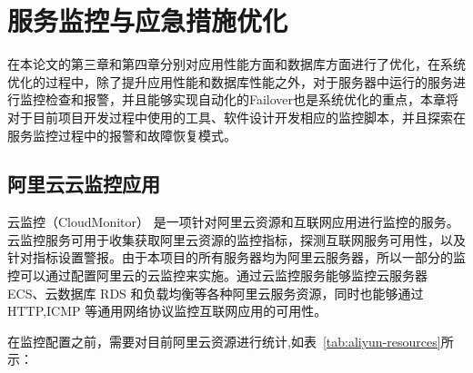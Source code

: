 \chapter{服务监控与应急措施优化}
在本论文的第三章和第四章分别对应用性能方面和数据库方面进行了优化，在系统优化的过程中，除了提升应用性能和数据库性能之外，对于服务器中运行的服务进行监控检查和报警，并且能够实现自动化的Failover也是系统优化的重点，本章将对于目前项目开发过程中使用的工具、软件设计开发相应的监控脚本，并且探索在服务监控过程中的报警和故障恢复模式。
\label{cha:Monitor}
\section{阿里云云监控应用}
云监控（CloudMonitor） 是一项针对阿里云资源和互联网应用进行监控的服务。云监控服务可用于收集获取阿里云资源的监控指标，探测互联网服务可用性，以及针对指标设置警报。由于本项目的所有服务器均为阿里云服务器，所以一部分的监控可以通过配置阿里云的云监控来实施。通过云监控服务能够监控云服务器 ECS、云数据库 RDS 和负载均衡等各种阿里云服务资源，同时也能够通过 HTTP,ICMP 等通用网络协议监控互联网应用的可用性。

在监控配置之前，需要对目前阿里云资源进行统计,如表~\ref{tab:aliyun-resources}所示：

